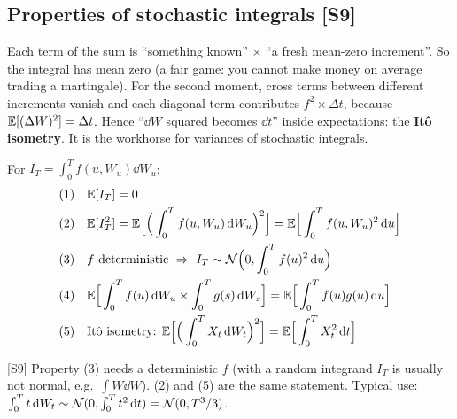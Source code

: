 \documentclass[10pt]{article}
\begin{document}
\subsection{Properties of stochastic integrals [S9]}
\begin{idea}
Each term of the sum is ``something known'' $\times$ ``a fresh mean-zero increment''. So the integral has mean zero (a fair game: you cannot make money on average trading a martingale). For the second moment, cross terms between different increments vanish and each diagonal term contributes $f^2\times\Delta t$, because $\mathbb{E}[(\Delta W)^2]=\Delta t$. Hence ``$\dd W$ squared becomes $\dd t$'' inside expectations: the \textbf{It\^o isometry}. It is the workhorse for variances of stochastic integrals.
\end{idea}
For $I_T=\int_0^Tf(u,W_u)\dd W_u$:
\begin{align*}
&(1)\quad \E[I_T]=0\\
&(2)\quad \E[I_T^2]=\E\Big[\Big(\int_0^Tf(u,W_u)\dd W_u\Big)^2\Big]=\E\Big[\int_0^Tf(u,W_u)^2\dd u\Big]\\
&(3)\quad f\text{ deterministic}\ \Rightarrow\ I_T\sim\N\Big(0,\int_0^Tf(u)^2\dd u\Big)\\
&(4)\quad \E\Big[\int_0^Tf(u)\dd W_u\times\int_0^Tg(s)\dd W_s\Big]=\E\Big[\int_0^Tf(u)g(u)\dd u\Big]\\
&(5)\quad \text{It\^o isometry: }\E\Big[\Big(\int_0^TX_t\dd W_t\Big)^2\Big]=\E\Big[\int_0^TX_t^2\dd t\Big]
\end{align*}
\begin{where}
\end{where}
\begin{exam}
\flag{} [S9] Property (3) needs a deterministic $f$ (with a random integrand $I_T$ is usually not normal, e.g.\ $\int W\dd W$). (2) and (5) are the same statement. Typical use: $\int_0^Tt\,\mathrm{d} W_t\sim\mathcal{N}(0,\int_0^Tt^2\,\mathrm{d} t)=\mathcal{N}(0,T^3/3)$.
\end{exam}
\end{document}
